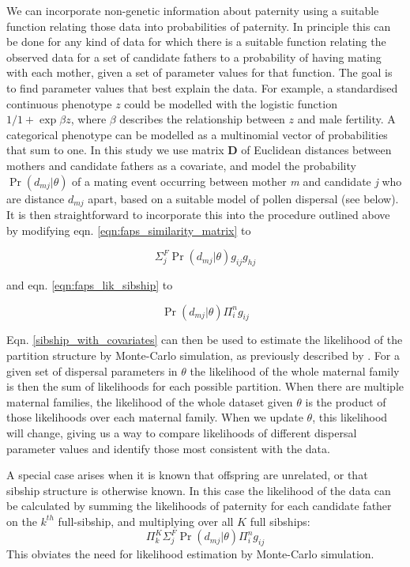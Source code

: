 \documentclass[10pt, a4paper, twocolumn]{article} %
\begin{document}
We can incorporate non-genetic information about paternity using a suitable function relating those data into probabilities of paternity.
In principle this can be done for any kind of data for which there is a suitable function relating the observed data for a set of candidate fathers to a probability of having mating with each mother, given a set of parameter values for that function. The goal is to find parameter values that best explain the data. For example, a standardised continuous phenotype $z$ could be modelled with the logistic function $1/1+\exp{\beta z}$, where $\beta$ describes the relationship between $z$ and male fertility. A categorical phenotype can be modelled as a multinomial vector of probabilities that sum to one. In this study we use matrix \textbf{D} of Euclidean distances between mothers and candidate fathers as a covariate, and model the probability $\Pr(d_{mj}|\theta)$ of a mating event occurring between mother \textit{m} and candidate \textit{j} who are distance $d_{mj}$ apart, based on a suitable model of pollen dispersal (see below). It is then straightforward to incorporate this into the procedure outlined above by modifying eqn. \ref{eqn:faps_similarity_matrix} to

\begin{equation}\label{eqn:pairwise_with_covariates}
\Sigma_j^F \Pr(d_{mj} | \theta)g_{ij}g_{hj}
\end{equation}

and eqn. \ref{eqn:faps_lik_sibship} to

\begin{equation}
\label{sibship_with_covariates}
\Pr(d_{mj} | \theta)\Pi_i^n g_{ij}
\end{equation}

Eqn. \ref{sibship_with_covariates} can then be used to estimate the likelihood of the partition structure by Monte-Carlo simulation, as previously described by \cite{ellis2018efficient}.
For a given set of dispersal parameters in $\theta$ the likelihood of the whole maternal family is then the sum of likelihoods for each possible partition. When there are multiple maternal families, the likelihood of the whole dataset given $\theta$ is the product of those likelihoods over each maternal family. When we update $\theta$, this likelihood will change, giving us a way to compare likelihoods of different dispersal parameter values and identify those most consistent with the data.

A special case arises when it is known that offspring are unrelated, or that sibship structure is otherwise known. In this case the likelihood of the data can be calculated by summing the likelihoods of paternity for each candidate father on the $k^{th}$ full-sibship, and multiplying over all $K$ full sibships:
\begin{equation}
    \label{eqn:lik_if_no_structure}
    \Pi_k^K\Sigma_j^F\Pr(d_{mj} | \theta)\Pi_i^n g_{ij}
\end{equation}
This obviates the need for likelihood estimation by Monte-Carlo simulation.
\end{document}
